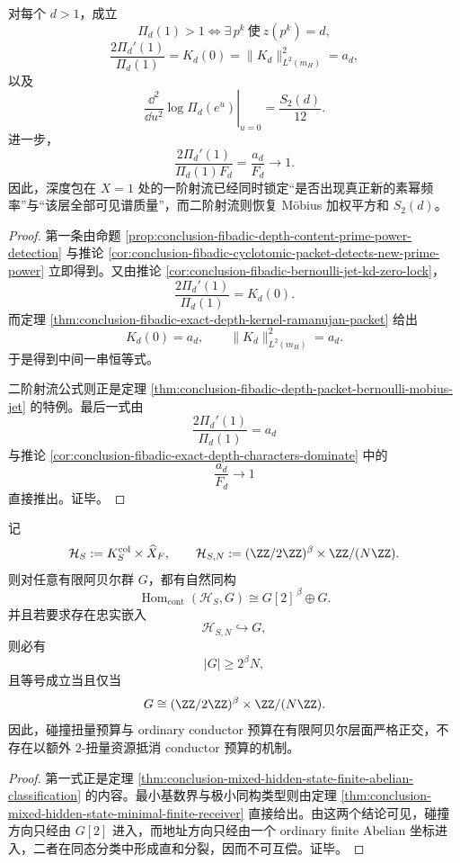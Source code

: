 \begin{theorem}[深度包在 \texorpdfstring{$X=1$}{X=1} 处的一点射流证书]\label{thm:conclusion-fibadic-depth-packet-onepoint-jet-certificate}
对每个 \(d>1\)，成立
\[
\Pi_d(1)>1
\iff
\exists\,p^k\ \text{使}\ z(p^k)=d,
\]
\[
\frac{2\Pi_d'(1)}{\Pi_d(1)}
=
K_d(0)
=
\|K_d\|_{L^2(m_H)}^2
=
a_d,
\]
以及
\[
\left.\frac{\dd^2}{\dd u^2}\log \Pi_d(e^u)\right|_{u=0}
=
\frac{S_2(d)}{12}.
\]
进一步，
\[
\frac{2\Pi_d'(1)}{\Pi_d(1)F_d}
=
\frac{a_d}{F_d}
\longrightarrow 1.
\]
因此，深度包在 \(X=1\) 处的一阶射流已经同时锁定“是否出现真正新的素幂频率”与“该层全部可见谱质量”，而二阶射流则恢复 Möbius 加权平方和 \(S_2(d)\)。
\end{theorem}
\begin{proof}
第一条由命题
\ref{prop:conclusion-fibadic-depth-content-prime-power-detection}
与推论
\ref{cor:conclusion-fibadic-cyclotomic-packet-detects-new-prime-power}
立即得到。又由推论
\ref{cor:conclusion-fibadic-bernoulli-jet-kd-zero-lock}，
\[
\frac{2\Pi_d'(1)}{\Pi_d(1)}=K_d(0).
\]
而定理 \ref{thm:conclusion-fibadic-exact-depth-kernel-ramanujan-packet}
给出
\[
K_d(0)=a_d,
\qquad
\|K_d\|_{L^2(m_H)}^2=a_d.
\]
于是得到中间一串恒等式。

二阶射流公式则正是定理
\ref{thm:conclusion-fibadic-depth-packet-bernoulli-mobius-jet}
的特例。最后一式由
\[
\frac{2\Pi_d'(1)}{\Pi_d(1)}=a_d
\]
与推论 \ref{cor:conclusion-fibadic-exact-depth-characters-dominate}
中的
\[
\frac{a_d}{F_d}\to 1
\]
直接推出。证毕。
\end{proof}

\begin{theorem}[有限阿贝尔受体上的双资源正交与预算不可互偿]\label{thm:conclusion-fibadic-abelian-receiver-budget-orthogonality}
记
\[
\mathcal H_S:=K_S^{\mathrm{col}}\times \widehat X_F,
\qquad
\mathcal H_{S,N}:=(\ZZ/2\ZZ)^\beta\times \ZZ/(N\ZZ).
\]
则对任意有限阿贝尔群 \(G\)，都有自然同构
\[
\operatorname{Hom}_{\mathrm{cont}}(\mathcal H_S,G)
\cong
G[2]^{\,\beta}\oplus G.
\]
并且若要求存在忠实嵌入
\[
\mathcal H_{S,N}\hookrightarrow G,
\]
则必有
\[
|G|\ge 2^\beta N,
\]
且等号成立当且仅当
\[
G\cong (\ZZ/2\ZZ)^\beta\times \ZZ/(N\ZZ).
\]
因此，碰撞扭量预算与 ordinary conductor 预算在有限阿贝尔层面严格正交，不存在以额外 \(2\)-扭量资源抵消 conductor 预算的机制。
\end{theorem}
\begin{proof}
第一式正是定理
\ref{thm:conclusion-mixed-hidden-state-finite-abelian-classification}
的内容。最小基数界与极小同构类型则由定理
\ref{thm:conclusion-mixed-hidden-state-minimal-finite-receiver}
直接给出。由这两个结论可见，碰撞方向只经由 \(G[2]\) 进入，而地址方向只经由一个 ordinary finite Abelian 坐标进入，二者在同态分类中形成直和分裂，因而不可互偿。证毕。
\end{proof}

